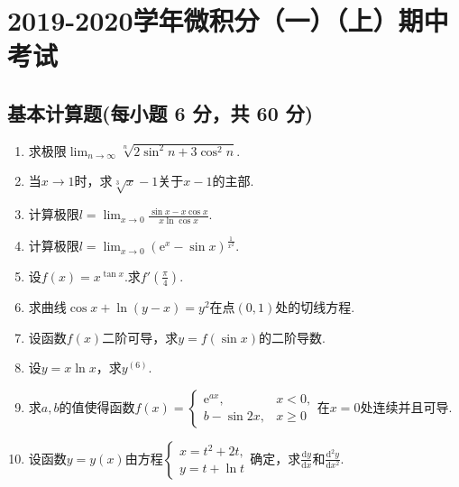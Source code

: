 \documentclass[../Main.tex]{subfiles}
\begin{document}
\chapter{2019-2020学年微积分（一）（上）期中考试}

\section{基本计算题(每小题 6 分，共 60 分)}
\begin{enumerate}
    \item 求极限$\lim_{n\to \infty}\sqrt[n]{2\sin^{2} n+3\cos^{2} n}$.
          \vspace{10em}

    \item 当$x\to1$时，求$\sqrt[3]{x}-1$关于$x-1$的主部.
          \vspace{12em}

    \item 计算极限$l=\lim_{x\to0}\frac{\sin x-x\cos x}{x\ln\cos x}$.
          \vspace{12em}

    \item 计算极限$l=\lim_{x\to0}\left(\mathrm{e}^{x}-\sin x\right)^{\frac{1}{x^{2}}}$.
          \vspace{11em}

    \item 设$f(x)=x^{\tan x}$.求$f'\left(\frac{\pi}{4}\right)$.
          \vspace{9em}

    \item 求曲线$\cos x+\ln(y-x)=y^{2}$在点$(0,1)$处的切线方程.
          \vspace{10em}

    \item 设函数$f(x)$二阶可导，求$y=f(\sin x)$的二阶导数.
          \vspace{10em}

    \item 设$y=x\ln x$，求$y^{(6)}$.
          \vspace{10em}

    \item 求$a,b$的值使得函数$f(x)=
              \begin{cases}
                  \mathrm{e}^{ax}, & x<0,   \\
                  b-\sin 2x,       & x\geq0
              \end{cases}$在$x=0$处连续并且可导.
          \vspace{8em}

    \item 设函数$y=y(x)$由方程$\begin{cases}
                  x=t^{2}+2t, \\
                  y=t+\ln t
              \end{cases}$确定，求$\frac{\mathrm{d}y}{\mathrm{d}x}$和$\frac{\mathrm{d}^{2}
                  y}{\mathrm{d}x^{2}}$.
          \vspace{8em}
\end{enumerate}
\end{document}
